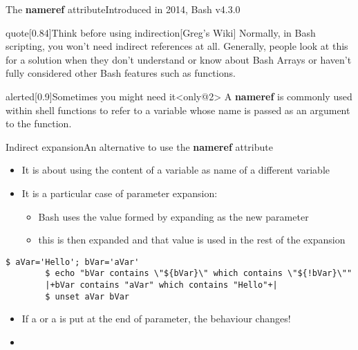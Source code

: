 \begin{frame}[fragile]{The \textbf{nameref} attribute}{Introduced in 2014, Bash v4.3.0}
\begin{varblock}{quote}[0.84\textwidth]{Think before using indirection}[Greg's Wiki]
        \smallskip
        Normally, in Bash scripting, you won't need indirect references at all.
        Generally, people look at this for a solution when they don't understand or know about Bash Arrays or haven't fully considered other Bash features such as functions.
        \smallskip
    \end{varblock}
    \begin{varblock}{alerted}[0.9\textwidth]{Sometimes you might need it}<only@2>
        A \textbf{nameref} is commonly used within shell functions to refer to a variable whose name is passed as an argument to the function.
    \end{varblock}
\end{frame}
\begin{frame}[fragile]{Indirect expansion}{An alternative to use the \textbf{nameref} attribute}
    \vspace{-3mm}
    \begin{itemize}
        \item It is about using the content of a variable as name of a different variable\\[1.5mm]
        \item It is a particular case of parameter expansion: 
              \begin{itemize}
                  \item Bash uses the value formed by expanding  as the new parameter
                  \item this is then expanded and that value is used in the rest of the expansion
              \end{itemize}
    \end{itemize}
    \begin{lstlisting}[style=MyBash, xrightmargin=1mm, aboveskip=2.5mm, belowskip=-4mm]
        $ aVar='Hello'; bVar='aVar'
        $ echo "bVar contains \"${bVar}\" which contains \"${!bVar}\""
        |+bVar contains "aVar" which contains "Hello"+|
        $ unset aVar bVar
    \end{lstlisting}
    \vspace{2mm}
    \begin{itemize}[<2->]
        \item If a \PB{\texttt{*}} or a  is put at the end of parameter, the behaviour changes!\\[0.3em]
        \small\setlength{\itemsep}{0mm}
        \item[] 

\end{itemize}
\end{frame}
